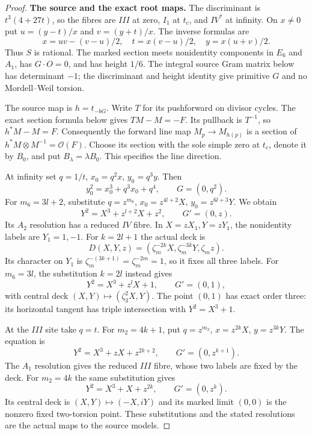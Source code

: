 \begin{proof}
\par\medskip\noindent\textbf{The source and the exact root maps.}
The discriminant is $t^3(4+27t)$, so the fibres are $III$ at zero,
$I_1$ at $t_c$, and $IV^*$ at infinity. On $x\ne0$ put
$u=(y-t)/x$ and $v=(y+t)/x$. The inverse formulas are
\[
 x=uv-(v-u)/2,\quad t=x(v-u)/2,\quad y=x(u+v)/2.
\]
Thus $S$ is rational. The marked section meets nonidentity
components in $E_6$ and $A_1$, has $G\cdot O=0$, and has
height $1/6$. The integral source Gram matrix below has determinant
$-1$; the discriminant and height identity give primitive $G$
and no Mordell--Weil torsion.

The source map is $h=t_{-bG}$. Write $T$ for its pushforward on
divisor cycles. The exact section formula below gives
$TM-M=-F$. Its pullback is $T^{-1}$, so $h^*M-M=F$.
Consequently the forward line map $M_p\to M_{h(p)}$ is a section
of $h^*M\otimes M^{-1}=\mathcal O(F)$. Choose its section with
the sole simple zero at $t_c$, denote it by $B_0$, and put
$B_\lambda=\lambda B_0$. This specifies the line direction.

At infinity set $q=1/t$, $x_0=q^2x$, $y_0=q^3y$. Then
\[
 y_0^2=x_0^3+q^3x_0+q^4,\qquad G=(0,q^2).
\]
For $m_6=3l+2$, substitute
$q=z^{m_6}$, $x_0=z^{4l+2}X$, $y_0=z^{6l+3}Y$. We obtain
\[
 Y^2=X^3+z^{l+2}X+z^2,\qquad G'=(0,z).                         \tag{F46.3}
\]
Its $A_2$ resolution has a reduced $IV$ fibre. In
$X=zX_1,Y=zY_1$, the nonidentity labels are $Y_1=1,-1$.
For $k=2l+1$ the actual deck is
\[
 D(X,Y,z)=(\zeta_m^{-2k}X,\zeta_m^{-3k}Y,\zeta_m z).
\]
Its character on $Y_1$ is
$\zeta_m^{-(3k+1)}=\zeta_m^{-2m}=1$, so it fixes all
three labels. For $m_6=3l$, the substitution $k=2l$ instead gives
\[
 Y^2=X^3+z^lX+1,\qquad G'=(0,1),                               \tag{F46.4}
\]
with central deck $(X,Y)\mapsto(\zeta_3^2X,Y)$.
The point $(0,1)$ has exact order three: its horizontal tangent
has triple intersection with $Y^2=X^3+1$.

At the $III$ site take $q=t$. For $m_2=4k+1$, put
$q=z^{m_2}$, $x=z^{2k}X$, $y=z^{3k}Y$. The equation is
\[
 Y^2=X^3+zX+z^{2k+2},\qquad G'=(0,z^{k+1}).                    \tag{F46.5}
\]
The $A_1$ resolution gives the reduced $III$ fibre, whose two
labels are fixed by the deck. For $m_2=4k$ the same substitution
gives
\[
 Y^2=X^3+X+z^{2k},\qquad G'=(0,z^k).                           \tag{F46.6}
\]
Its central deck is $(X,Y)\mapsto(-X,iY)$ and its marked
limit $(0,0)$ is the nonzero fixed two-torsion point.
These substitutions and the stated resolutions are the actual
maps to the source models.


\end{proof}
